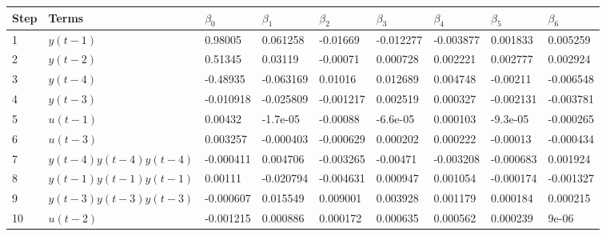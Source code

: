 \begin{tabular}{lllllllll}
Step & Terms & $\beta_{0}$ & $\beta_{1}$ & $\beta_{2}$ & $\beta_{3}$ & $\beta_{4}$ & $\beta_{5}$ & $\beta_{6}$ \\ 
\hline 
1 & $y(t-1)$ & 0.98005 & 0.061258 & -0.01669 & -0.012277 & -0.003877 & 0.001833 & 0.005259 \\ 
2 & $y(t-2)$ & 0.51345 & 0.03119 & -0.00071 & 0.000728 & 0.002221 & 0.002777 & 0.002924 \\ 
3 & $y(t-4)$ & -0.48935 & -0.063169 & 0.01016 & 0.012689 & 0.004748 & -0.00211 & -0.006548 \\ 
4 & $y(t-3)$ & -0.010918 & -0.025809 & -0.001217 & 0.002519 & 0.000327 & -0.002131 & -0.003781 \\ 
5 & $u(t-1)$ & 0.00432 & -1.7e-05 & -0.00088 & -6.6e-05 & 0.000103 & -9.3e-05 & -0.000265 \\ 
6 & $u(t-3)$ & 0.003257 & -0.000403 & -0.000629 & 0.000202 & 0.000222 & -0.00013 & -0.000434 \\ 
7 & $y(t-4)y(t-4)y(t-4)$ & -0.000411 & 0.004706 & -0.003265 & -0.00471 & -0.003208 & -0.000683 & 0.001924 \\ 
8 & $y(t-1)y(t-1)y(t-1)$ & 0.00111 & -0.020794 & -0.004631 & 0.000947 & 0.001054 & -0.000174 & -0.001327 \\ 
9 & $y(t-3)y(t-3)y(t-3)$ & -0.000607 & 0.015549 & 0.009001 & 0.003928 & 0.001179 & 0.000184 & 0.000215 \\ 
10 & $u(t-2)$ & -0.001215 & 0.000886 & 0.000172 & 0.000635 & 0.000562 & 0.000239 & 9e-06 \\ 
\hline 
\end{tabular}